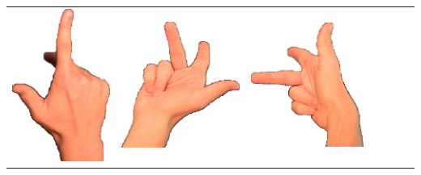 \documentclass{article}
\begin{document}
\begin{center}
\begin{tabular}{r*{6}{c}}
\includegraphics[scale=0.1]{images/03-04-3.jpg}&
\includegraphics[scale=0.1]{images/03-04-4.jpg}&
\includegraphics[scale=0.1]{images/03-04-5.jpg}&

\end{tabular}
\end{center}
\end{document}
